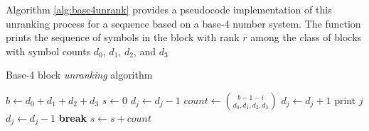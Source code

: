 \noindent Algorithm \ref{alg:base4unrank} provides a pseudocode implementation of this unranking process for a sequence based on a base-4 number system. The function prints the sequence of symbols in the block with rank $r$ among the class of blocks with symbol counts $d_0$, $d_1$, $d_2$, and $d_3$

\begin{algorithm}[h!]
    \caption{Base-4 block \emph{unranking} algorithm}
    \label{alg:base4unrank}
    \begin{algorithmic}
        \State $b \gets d_0 + d_1 + d_2 + d_3$ 
        \State $s \gets 0$ 
         
        \State $d_j \gets d_j - 1$
        \State $count \gets \binom{b - 1 - i}{d_0, d_1, d_2, d_3}$
        \State $d_j \gets d_j + 1$
        \State print $j$
        \State $d_j \gets d_j - 1$
        \State \textbf{break}
        \Else
        \State $s \gets s + count$
        \EndIf
        \EndFor
        \EndFor
        \EndFunction
    \end{algorithmic}
\end{algorithm}
